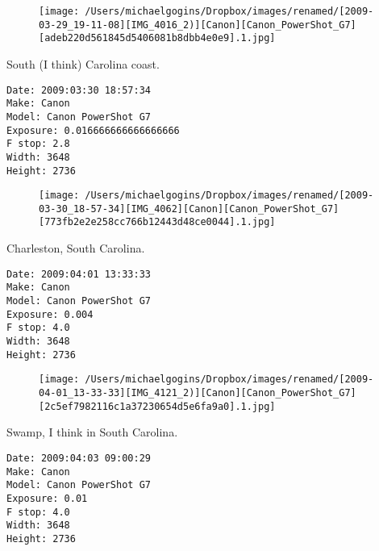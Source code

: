\documentclass[11pt,letter,DIV=14,paper=landscape]{scrbook}
\begin{document}
\begin{figure}
\texttt{[image: /Users/michaelgogins/Dropbox/images/renamed/[2009-03-29\_19-11-08][IMG\_4016\_2)][Canon][Canon\_PowerShot\_G7][adeb220d561845d5406081b8dbb4e0e9].1.jpg]}
\end{figure}
    
\clearpage
\noindent South (I think) Carolina coast.
\noindent
\begin{lstlisting}
Date: 2009:03:30 18:57:34
Make: Canon
Model: Canon PowerShot G7
Exposure: 0.016666666666666666
F stop: 2.8
Width: 3648
Height: 2736
\end{lstlisting}
\clearpage

\begin{figure}
\texttt{[image: /Users/michaelgogins/Dropbox/images/renamed/[2009-03-30\_18-57-34][IMG\_4062][Canon][Canon\_PowerShot\_G7][773fb2e2e258cc766b12443d48ce0044].1.jpg]}
\end{figure}
    
\clearpage
\noindent Charleston, South Carolina.
\noindent
\begin{lstlisting}
Date: 2009:04:01 13:33:33
Make: Canon
Model: Canon PowerShot G7
Exposure: 0.004
F stop: 4.0
Width: 3648
Height: 2736
\end{lstlisting}
\clearpage

\begin{figure}
\texttt{[image: /Users/michaelgogins/Dropbox/images/renamed/[2009-04-01\_13-33-33][IMG\_4121\_2)][Canon][Canon\_PowerShot\_G7][2c5ef7982116c1a37230654d5e6fa9a0].1.jpg]}
\end{figure}
    
\clearpage
\noindent Swamp, I think in South Carolina.
\noindent
\begin{lstlisting}
Date: 2009:04:03 09:00:29
Make: Canon
Model: Canon PowerShot G7
Exposure: 0.01
F stop: 4.0
Width: 3648
Height: 2736
\end{lstlisting}
\clearpage
\end{document}
